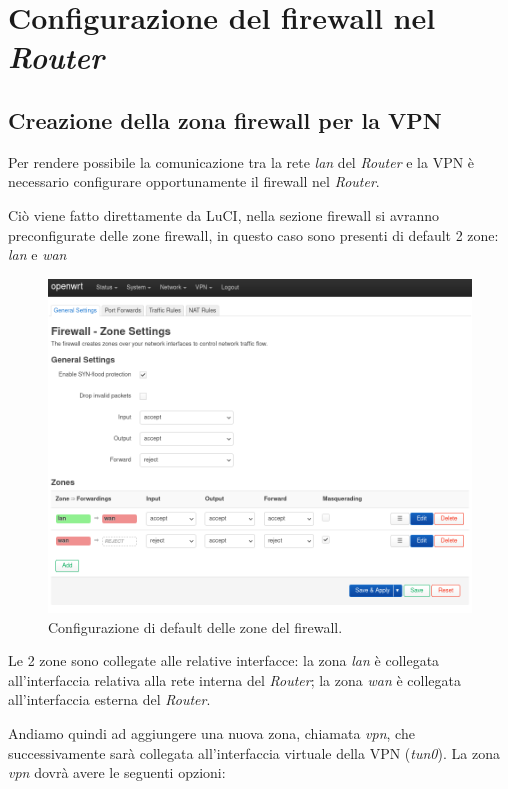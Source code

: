 \section{Configurazione del firewall nel \textit{Router} \ok}

\subsection{Creazione della zona firewall per la VPN \ok}
\label{subsec:creazione-firewall-zone-vpn}

Per rendere possibile la comunicazione tra la rete \textit{lan} del \textit{Router} e la VPN è necessario configurare opportunamente il firewall nel \textit{Router}.

Ciò viene fatto direttamente da LuCI, nella sezione firewall si avranno preconfigurate delle zone firewall, in questo caso sono presenti di default 2 zone: \textit{lan} e \textit{wan}

\begin{figure}[H]
    \centering
    \includegraphics[width=1\linewidth]{immagini/LuCI_firewall_init1}
    \caption{Configurazione di default delle zone del firewall.}
    \label{fig:luci-firewall-init}
\end{figure}

Le 2 zone sono collegate alle relative interfacce: la zona \textit{lan} è collegata all'interfaccia relativa alla rete interna del \textit{Router}; la zona \textit{wan} è collegata all'interfaccia esterna del \textit{Router}. 

Andiamo quindi ad aggiungere una nuova zona, chiamata \textit{vpn}, che successivamente sarà collegata all'interfaccia virtuale della VPN (\textit{tun0}). La zona \textit{vpn} dovrà avere le seguenti opzioni:

